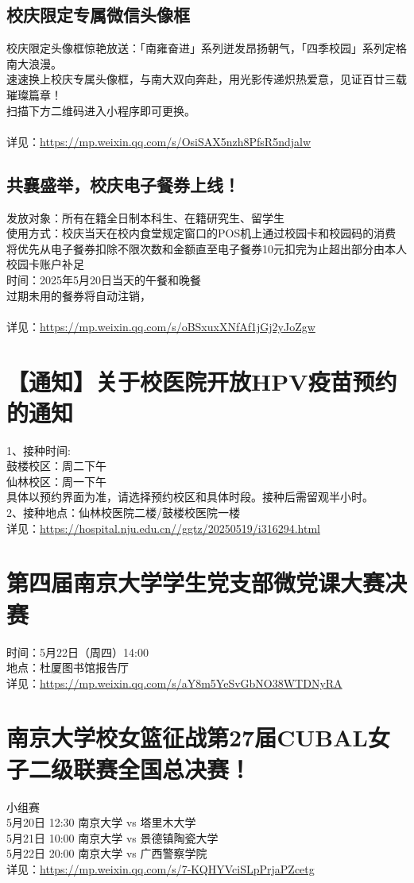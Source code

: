 \documentclass[letterpaper, 12pt]{article}
\begin{document}
\begin{multicols}{2}
\subsection{校庆限定专属微信头像框} %
校庆限定头像框惊艳放送：「南雍奋进」系列迸发昂扬朝气，「四季校园」系列定格南大浪漫。
\\速速换上校庆专属头像框，与南大双向奔赴，用光影传递炽热爱意，见证百廿三载璀璨篇章！
\\扫描下方二维码进入小程序即可更换。
\\
\\详见：\url{https://mp.weixin.qq.com/s/OsiSAX5nzh8PfsR5ndjalw}
\subsection{共襄盛举，校庆电子餐券上线！} %
发放对象：所有在籍全日制本科生、在籍研究生、留学生
\\使用方式：校庆当天在校内食堂规定窗口的POS机上通过校园卡和校园码的消费将优先从电子餐券扣除不限次数和金额直至电子餐券10元扣完为止超出部分由本人校园卡账户补足
\\时间：2025年5月20日当天的午餐和晚餐
\\过期未用的餐券将自动注销，
\\
\\详见：\url{https://mp.weixin.qq.com/s/oBSxuxXNfAf1jGj2yJoZgw}

\section{【通知】关于校医院开放HPV疫苗预约的通知} %
1、接种时间:
\\鼓楼校区：周二下午
\\仙林校区：周一下午
\\具体以预约界面为准，请选择预约校区和具体时段。接种后需留观半小时。
\\2、接种地点：仙林校医院二楼/鼓楼校医院一楼
\\详见：\url{https://hospital.nju.edu.cn//ggtz/20250519/i316294.html}
\section{第四届南京大学学生党支部微党课大赛决赛} %
时间：5月22日（周四）14:00
\\地点：杜厦图书馆报告厅
\\详见：\url{https://mp.weixin.qq.com/s/aY8m5YeSvGbNO38WTDNyRA}
\section{南京大学校女篮征战第27届CUBAL女子二级联赛全国总决赛！} %
小组赛
\\5月20日 12:30 南京大学 vs 塔里木大学
\\5月21日 10:00 南京大学 vs 景德镇陶瓷大学
\\5月22日 20:00 南京大学 vs 广西警察学院
\\详见：\url{https://mp.weixin.qq.com/s/7-KQHYVciSLpPrjaPZcetg}

\end{multicols}
\end{document}
